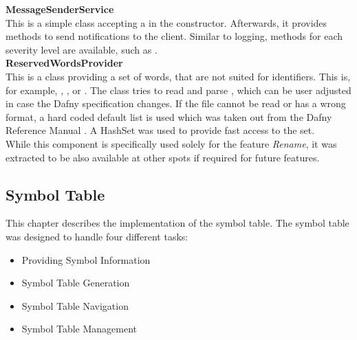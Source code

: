 \textbf{MessageSenderService}\\
This is a simple class accepting a  in the constructor.
Afterwards, it provides methods to send notifications to the client.
Similar to logging, methods for each severity level are available, such as .\\

\textbf{ReservedWordsProvider}\\
This is a class providing a set of words, that are not suited for identifiers.
This is, for example, , , or .
The class tries to read and parse , which can be user adjusted in case the Dafny specification changes.
If the file cannot be read or has a wrong format, a hard coded default list is used which was taken out from the Dafny Reference Manual \cite{dafnyReferenceManual}.
A HashSet was used to provide fast access to the set.\\

While this component is specifically used solely for the feature \textit{Rename},
it was extracted to be also available at other spots if required for future features.


\subsection{Symbol Table}
This chapter describes the implementation of the symbol table.
The symbol table was designed to handle four different tasks:

\begin{itemize}
    \item Providing Symbol Information
    \item Symbol Table Generation
    \item Symbol Table Navigation
    \item Symbol Table Management
\end{itemize}

